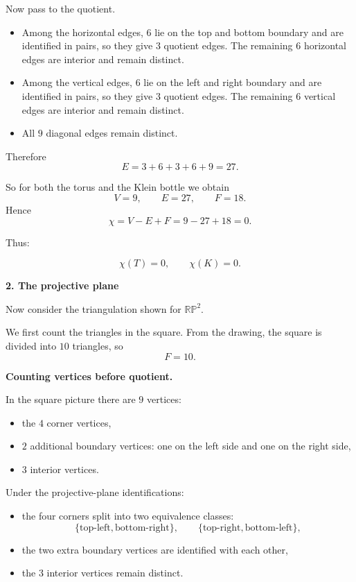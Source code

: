 \begin{solution}
Now pass to the quotient.

\begin{itemize}
	\item Among the horizontal edges, \(6\) lie on the top and bottom boundary and are identified in pairs, so they give \(3\) quotient edges. The remaining \(6\) horizontal edges are interior and remain distinct.
	\item Among the vertical edges, \(6\) lie on the left and right boundary and are identified in pairs, so they give \(3\) quotient edges. The remaining \(6\) vertical edges are interior and remain distinct.
	\item All \(9\) diagonal edges remain distinct.
\end{itemize}

Therefore
\[
E = 3+6+3+6+9 = 27.
\]

So for both the torus and the Klein bottle we obtain
\[
V=9,\qquad E=27,\qquad F=18.
\]
Hence
\[
\chi = V-E+F = 9-27+18 = 0.
\]

Thus:

\[
\boxed{\chi(T)=0}, \qquad \boxed{\chi(K)=0}.
\]

\par

\textbf{2. The projective plane}

Now consider the triangulation shown for \(\mathbb{RP}^2\).

We first count the triangles in the square. From the drawing, the square is divided into \(10\) triangles, so
\[
F=10.
\]

\par

\textbf{Counting vertices before quotient.}

In the square picture there are \(9\) vertices:

\begin{itemize}
	\item the \(4\) corner vertices,
	\item \(2\) additional boundary vertices: one on the left side and one on the right side,
	\item \(3\) interior vertices.
\end{itemize}

Under the projective-plane identifications:
\begin{itemize}
	\item the four corners split into two equivalence classes:
	\[
	\{\text{top-left},\text{bottom-right}\},\qquad
	\{\text{top-right},\text{bottom-left}\},
	\]
	\item the two extra boundary vertices are identified with each other,
	\item the \(3\) interior vertices remain distinct.
\end{itemize}


\end{solution}
